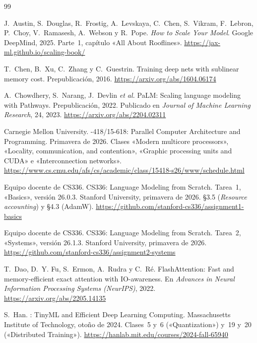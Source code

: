 \begin{thebibliography}{99}
\small

J.~Austin, S.~Douglas, R.~Frostig, A.~Levskaya, C.~Chen, S.~Vikram, F.~Lebron, P.~Choy, V.~Ramasesh, A.~Webson y R.~Pope.
\newblock \emph{How to Scale Your Model}.
\newblock Google DeepMind, 2025. Parte~1, capítulo «All About Rooflines».
\newblock \url{https://jax-ml.github.io/scaling-book/}

T.~Chen, B.~Xu, C.~Zhang y C.~Guestrin.
\newblock Training deep nets with sublinear memory cost.
\newblock Prepublicación, 2016.
\newblock \url{https://arxiv.org/abs/1604.06174}

A.~Chowdhery, S.~Narang, J.~Devlin \emph{et al.}
\newblock PaLM: Scaling language modeling with Pathways.
\newblock Prepublicación, 2022. Publicado en \emph{Journal of Machine Learning Research}, 24, 2023.
\newblock \url{https://arxiv.org/abs/2204.02311}

Carnegie Mellon University.
-418/15-618: Parallel Computer Architecture and Programming.
\newblock Primavera de 2026. Clases «Modern multicore processors», «Locality, communication, and contention», «Graphic processing units and CUDA» e «Interconnection networks».
\newblock \url{https://www.cs.cmu.edu/afs/cs/academic/class/15418-s26/www/schedule.html}

Equipo docente de CS336.
\newblock CS336: Language Modeling from Scratch. Tarea~1, «Basics», versión 26.0.3.
\newblock Stanford University, primavera de 2026. §3.5 (\emph{Resource accounting}) y §4.3 (AdamW).
\newblock \url{https://github.com/stanford-cs336/assignment1-basics}

Equipo docente de CS336.
\newblock CS336: Language Modeling from Scratch. Tarea~2, «Systems», versión 26.1.3.
\newblock Stanford University, primavera de 2026.
\newblock \url{https://github.com/stanford-cs336/assignment2-systems}

T.~Dao, D.~Y. Fu, S.~Ermon, A.~Rudra y C.~Ré.
\newblock FlashAttention: Fast and memory-efficient exact attention with IO-awareness.
\newblock En \emph{Advances in Neural Information Processing Systems (NeurIPS)}, 2022.
\newblock \url{https://arxiv.org/abs/2205.14135}

S.~Han.
: TinyML and Efficient Deep Learning Computing.
\newblock Massachusetts Institute of Technology, otoño de 2024. Clases~5 y~6 («Quantization») y~19 y~20 («Distributed Training»).
\newblock \url{https://hanlab.mit.edu/courses/2024-fall-65940}


\end{thebibliography}
